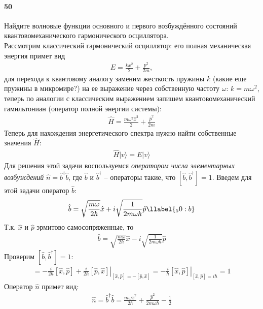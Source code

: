 



\paragraph{50}
Найдите волновые функции основного и первого возбуждённого состояний квантовомеханического гармонического осциллятора.\\

Рассмотрим классический гармонический осциллятор: его полная механическая энергия примет вид
\begin{gather*}
E = \frac{kx^2}{2}+\frac{p^2}{2m},
\end{gather*}
для перехода к квантовому аналогу заменим жесткость пружины $k$ (какие еще пружины в микромире?) на ее выражение через собственную частоту $\omega$: $k=m\omega^2$, теперь по аналогии с классическим выражением запишем квантовомеханический гамильтониан (оператор полной энергии системы):
\begin{gather*}
\hat{H} = \frac{m\omega^2\hat{x}^2}{2}+\frac{\hat{p}^2}{2m}
\end{gather*}
Теперь для нахождения энергетического спектра нужно найти собственные значения $\hat{H}$:
\begin{gather*}
\hat{H}|v\rangle = E|v\rangle
\end{gather*}
Для решения этой задачи воспользуемся \textit{оператором числа элементарных возбуждений} $\hat{n}=\hat{b}^\dagger\hat{b}$, где $\hat{b}$ и $\hat{b}^\dagger$ -- операторы такие, что $[\hat{b},\hat{b}^\dagger]=1$. Введем для этой задачи оператор $\hat{b}$: 
\begin{gather}
\hat{b} = \sqrt{\frac{m\omega}{2\hbar}}\hat{x} + i\sqrt{\frac{1}{2m\omega\hbar}}\hat{p}
\llabel{_50:b}
\end{gather}
Т.к. $\hat{x}$ и $\hat{p}$ эрмитово самосопряженные, то
\begin{gather*}
\hat{b} = \sqrt{\frac{m\omega}{2\hbar}}\hat{x} - i\sqrt{\frac{1}{2m\omega\hbar}}\hat{p}
\end{gather*}
Проверим $[\hat{b},\hat{b}^\dagger]=1$:
\begin{gather*}
[\hat{b},\hat{b}^\dagger]
=
\left.
-\frac{i}{2\hbar}[\hat{x},\hat{p}]+\frac{i}{2\hbar}[\hat{p},\hat{x}]
\right|_{[\hat{x},\hat{p}]=-[\hat{p},\hat{x}]}
=
\left.
-\frac{i}{\hbar}[\hat{x},\hat{p}]
\right|_{[\hat{x},\hat{p}]=i\hbar}
=
1
\end{gather*}
Оператор $\hat{n}$ примет вид:
\begin{gather*}
\hat{n}=\hat{b}^\dagger\hat{b}=\frac{m\omega\hat{x}^2}{2\hbar}+\frac{\hat{p}^2}{2m\omega\hbar}-\frac{1}{2}
\end{gather*}
